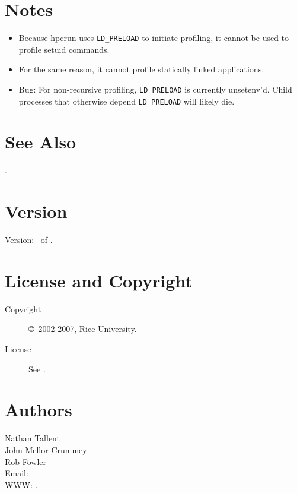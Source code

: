 \documentclass[english]{article}
\begin{document}
\section{Notes}

\begin{itemize}
  \item Because hpcrun uses \verb+LD_PRELOAD+ to initiate profiling, it cannot be used to profile setuid commands.
  \item For the same reason, it cannot profile statically linked applications.
  \item Bug: For non-recursive profiling, \verb+LD_PRELOAD+ is currently unsetenv'd.  Child processes that otherwise depend \verb+LD_PRELOAD+ will likely die.
\end{itemize}


\section{See Also}

.

\section{Version}

Version: \Version\ of \Date.

\section{License and Copyright}

\begin{description}
\item[Copyright] \copyright\ 2002-2007, Rice University.
\item[License] See .
\end{description}

\section{Authors}

\noindent
Nathan Tallent \\
John Mellor-Crummey \\
Rob Fowler \\
Email:  \\
WWW: .

\LatexManEnd
\end{document}
